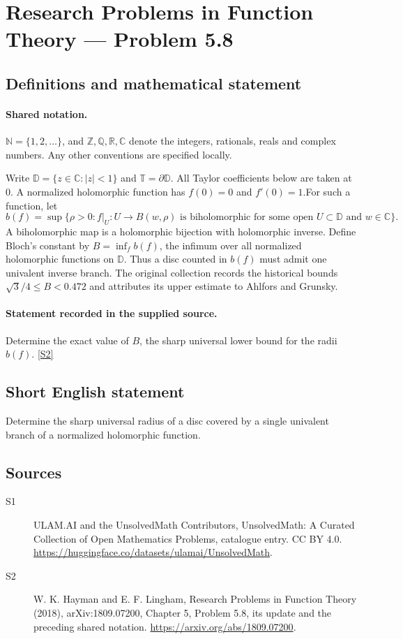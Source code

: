 \documentclass[11pt]{article}
\newcommand{\sref}[2]{\hyperlink{source:#1:#2}{[S#2]}}
\begin{document}
\section{Research Problems in Function Theory — Problem 5.8}\label{statement}

\subsection{Definitions and mathematical statement}

\paragraph{Shared notation.}$\mathbb N=\{1,2,\ldots\}$, and $\mathbb Z,\mathbb Q,\mathbb R,\mathbb C$ denote the integers, rationals, reals and complex numbers. Any other conventions are specified locally.


Write $\mathbb D=\{z\in\mathbb C:|z|<1\}$ and $\mathbb T=\partial\mathbb D$. All Taylor coefficients below are taken at $0$. A normalized holomorphic function has $f(0)=0$ and $f'(0)=1$.For such a function, let
\[b(f)=\sup\{\rho>0: f|_U:U\longrightarrow B(w,\rho)\text{ is biholomorphic for some open }U\subset\mathbb D\text{ and }w\in\mathbb C\}.\]
A biholomorphic map is a holomorphic bijection with holomorphic inverse. Define Bloch's constant by $B=\inf_f b(f)$, the infimum over all normalized holomorphic functions on $\mathbb D$. Thus a disc counted in $b(f)$ must admit one univalent inverse branch. The original collection records the historical bounds $\sqrt3/4\le B<0.472$ and attributes its upper estimate to Ahlfors and Grunsky.
\paragraph{Statement recorded in the supplied source.}
Determine the exact value of $B$, the sharp universal lower bound for the radii $b(f)$. \sref{statement}{2}
\subsection{Short English statement}
Determine the sharp universal radius of a disc covered by a single univalent branch of a normalized holomorphic function.
\subsection{Sources}
\begin{description}
\item[\hypertarget{source:statement:1}{S1}] ULAM.AI and the UnsolvedMath Contributors, UnsolvedMath: A Curated Collection of Open Mathematics Problems, catalogue entry. CC BY 4.0. \url{https://huggingface.co/datasets/ulamai/UnsolvedMath}.
\item[\hypertarget{source:statement:2}{S2}] W. K. Hayman and E. F. Lingham, Research Problems in Function Theory (2018), arXiv:1809.07200, Chapter 5, Problem 5.8, its update and the preceding shared notation. \url{https://arxiv.org/abs/1809.07200}.
\end{description}
\label{end:statement}
\end{document}

